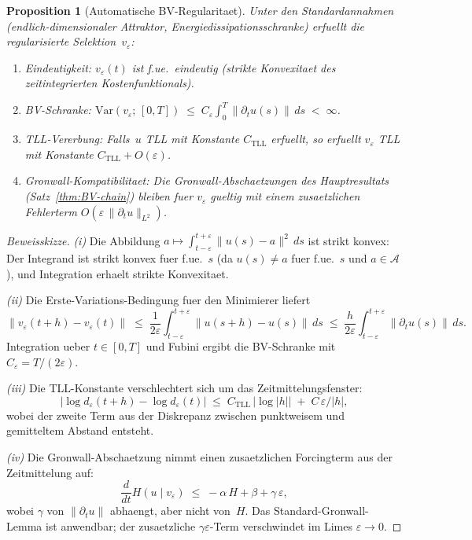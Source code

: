 \documentclass[12pt,a4paper]{article}
\theoremstyle{definition}
\theoremstyle{plain}
\newtheorem{proposition}[definition]{Proposition}
\theoremstyle{remark}
\newcommand{\Var}{\mathrm{Var}}
\begin{document}
\begin{proposition}[Automatische BV-Regularitaet]
\label{prop:bv-regularity}
Unter den Standardannahmen (endlich-dimensionaler Attraktor,
Energiedissipationsschranke) erfuellt die regularisierte
Selektion~$v_\varepsilon$:
\begin{enumerate}[label=(\roman*)]
\item \emph{Eindeutigkeit:}  $v_\varepsilon(t)$ ist f.ue.\ eindeutig
  (strikte Konvexitaet des zeitintegrierten Kostenfunktionals).
\item \emph{BV-Schranke:}
  $\Var(v_\varepsilon;\,[0,T])
   \;\le\;
   C_\varepsilon
   \int_0^T \|\partial_t u(s)\|\,ds
   \;<\; \infty$.
\item \emph{TLL-Vererbung:}  Falls~$u$ TLL mit Konstante
  $C_{\mathrm{TLL}}$ erfuellt, so erfuellt $v_\varepsilon$ TLL mit
  Konstante $C_{\mathrm{TLL}} + O(\varepsilon)$.
\item \emph{Gronwall-Kompatibilitaet:}  Die Gronwall-Abschaetzungen
  des Hauptresultats (Satz~\ref{thm:BV-chain}) bleiben fuer
  $v_\varepsilon$ gueltig mit einem zusaetzlichen Fehlerterm
  $O(\varepsilon\,\|\partial_t u\|_{L^2})$.
\end{enumerate}
\end{proposition}

\begin{proof}[Beweisskizze]
\emph{(i)}\; Die Abbildung
$a \mapsto \int_{t-\varepsilon}^{t+\varepsilon} \|u(s)-a\|^2\,ds$
ist strikt konvex: Der Integrand ist strikt konvex fuer f.ue.~$s$
(da $u(s) \neq a$ fuer f.ue.~$s$ und $a \in \mathcal{A}$), und
Integration erhaelt strikte Konvexitaet.

\emph{(ii)}\; Die Erste-Variations-Bedingung fuer den Minimierer
liefert
\[
  \|v_\varepsilon(t+h) - v_\varepsilon(t)\|
  \;\le\;
  \frac{1}{2\varepsilon}
  \int_{t-\varepsilon}^{t+\varepsilon}
  \|u(s+h) - u(s)\|\,ds
  \;\le\;
  \frac{h}{2\varepsilon}
  \int_{t-\varepsilon}^{t+\varepsilon}
  \|\partial_t u(s)\|\,ds.
\]
Integration ueber $t \in [0,T]$ und Fubini ergibt die BV-Schranke
mit $C_\varepsilon = T/(2\varepsilon)$.

\emph{(iii)}\; Die TLL-Konstante verschlechtert sich um das
Zeitmittelungsfenster:
\[
  |\log d_\varepsilon(t+h) - \log d_\varepsilon(t)|
  \;\le\;
  C_{\mathrm{TLL}}\,|\log|h||
  \;+\;
  C\,\varepsilon/|h|,
\]
wobei der zweite Term aus der Diskrepanz zwischen punktweisem und
gemitteltem Abstand entsteht.

\emph{(iv)}\; Die Gronwall-Abschaetzung nimmt einen zusaetzlichen
Forcingterm aus der Zeitmittelung auf:
\[
  \frac{d}{dt} H(u \mid v_\varepsilon)
  \;\le\;
  -\alpha\,H + \beta + \gamma\,\varepsilon,
\]
wobei $\gamma$ von $\|\partial_t u\|$ abhaengt, aber nicht von~$H$.
Das Standard-Gronwall-Lemma ist anwendbar; der zusaetzliche
$\gamma\varepsilon$-Term verschwindet im Limes
$\varepsilon \to 0$.
\end{proof}
\end{document}
